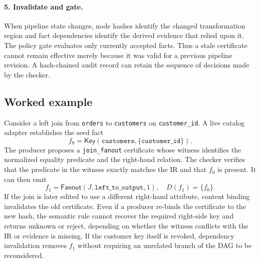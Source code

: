 \paragraph{5. Invalidate and gate.}
When pipeline state changes, node hashes identify the changed transformation region and fact dependencies identify the derived evidence that relied upon it. The policy gate evaluates only currently accepted facts. Thus a stale certificate cannot remain effective merely because it was valid for a previous pipeline revision. A hash-chained audit record can retain the sequence of decisions made by the checker.

\subsection{Worked example}

Consider a left join from \texttt{orders} to \texttt{customers} on \texttt{customer\_id}. A live catalog adapter establishes the seed fact
\[
  f_0=\mathsf{Key}(\texttt{customers},\{\texttt{customer\_id}\}).
\]
The producer proposes a \texttt{join\_fanout} certificate whose witness identifies the normalized equality predicate and the right-hand relation. The checker verifies that the predicate in the witness exactly matches the IR and that $f_0$ is present. It can then emit
\[
  f_1=\mathsf{Fanout}(J,\texttt{left\_to\_output},1),\quad D(f_1)=\{f_0\}.
\]
If the join is later edited to use a different right-hand attribute, content binding invalidates the old certificate. Even if a producer re-binds the certificate to the new hash, the semantic rule cannot recover the required right-side key and returns \textsf{unknown} or \textsf{reject}, depending on whether the witness conflicts with the IR or evidence is missing. If the customer key itself is revoked, dependency invalidation removes $f_1$ without requiring an unrelated branch of the DAG to be reconsidered.
